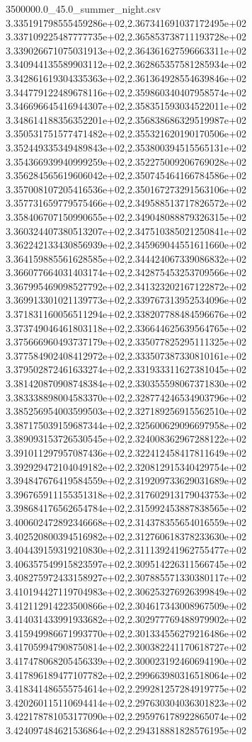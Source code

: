 \begin{filecontents*}{3500000.0_45.0_summer_night.csv}
3.335191798555459286e+02,2.367341691037172495e+02
3.337109225487777735e+02,2.365853738711193728e+02
3.339026671075031913e+02,2.364361627596663311e+02
3.340944135589903112e+02,2.362865357581285934e+02
3.342861619304335363e+02,2.361364928554639846e+02
3.344779122489678116e+02,2.359860340407958574e+02
3.346696645416944307e+02,2.358351593034522011e+02
3.348614188356352201e+02,2.356838686329519987e+02
3.350531751577471482e+02,2.355321620190170506e+02
3.352449335349489843e+02,2.353800394515565131e+02
3.354366939940999259e+02,2.352275009206769028e+02
3.356284565619606042e+02,2.350745464166784586e+02
3.357008107205416536e+02,2.350167273291563106e+02
3.357731659779575466e+02,2.349588513717826572e+02
3.358406707150990655e+02,2.349048088879326315e+02
3.360324407380513207e+02,2.347510385021250841e+02
3.362242133430856939e+02,2.345969044551611660e+02
3.364159885561628585e+02,2.344424067339086832e+02
3.366077664031403174e+02,2.342875453253709566e+02
3.367995469098527792e+02,2.341323202167122872e+02
3.369913301021139773e+02,2.339767313952534096e+02
3.371831160056511294e+02,2.338207788484596676e+02
3.373749046461803118e+02,2.336644625639564765e+02
3.375666960493737179e+02,2.335077825295111325e+02
3.377584902408412972e+02,2.333507387330810161e+02
3.379502872461633274e+02,2.331933311627381045e+02
3.381420870908748384e+02,2.330355598067371830e+02
3.383338898004583370e+02,2.328774246534903796e+02
3.385256954003599503e+02,2.327189256915562510e+02
3.387175039159687344e+02,2.325600629096697958e+02
3.389093153726530545e+02,2.324008362967288122e+02
3.391011297957087436e+02,2.322412458417811649e+02
3.392929472104049182e+02,2.320812915340429754e+02
3.394847676419584559e+02,2.319209733629031689e+02
3.396765911155351318e+02,2.317602913179043753e+02
3.398684176562654784e+02,2.315992453887838565e+02
3.400602472892346668e+02,2.314378355654016559e+02
3.402520800394516982e+02,2.312760618378233630e+02
3.404439159319210830e+02,2.311139241962755477e+02
3.406357549915823597e+02,2.309514226311566745e+02
3.408275972433158927e+02,2.307885571330380117e+02
3.410194427119704983e+02,2.306253276926399849e+02
3.412112914223500866e+02,2.304617343008967509e+02
3.414031433991933682e+02,2.302977769488979902e+02
3.415949986671993770e+02,2.301334556279216486e+02
3.417059947908750814e+02,2.300382241170618727e+02
3.417478068205456339e+02,2.300023192460694190e+02
3.417896189477107782e+02,2.299663980316518064e+02
3.418341486555754614e+02,2.299281257284919775e+02
3.420260115110694414e+02,2.297630304036301823e+02
3.422178781053177090e+02,2.295976178922865074e+02
3.424097484621536864e+02,2.294318881828576195e+02

\end{filecontents*}
